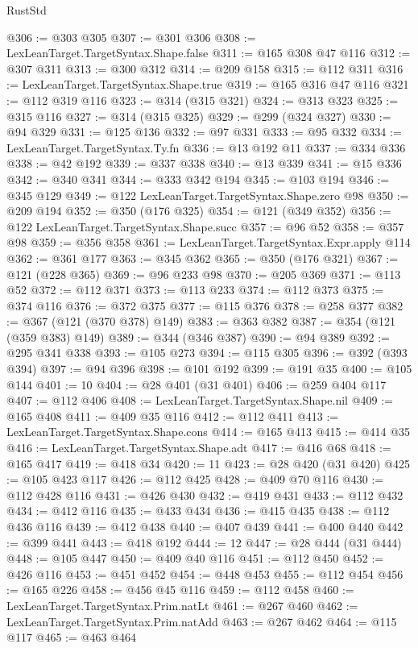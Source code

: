 \begin{lexlean}{RustStd}
\begin{coremodule}
@306 := @303 @305
@307 := @301 @306
@308 := LexLeanTarget.TargetSyntax.Shape.false
@311 := @165 @308 @47 @116
@312 := @307 @311
@313 := @300 @312
@314 := @209 @158
@315 := @112 @311
@316 := LexLeanTarget.TargetSyntax.Shape.true
@319 := @165 @316 @47 @116
@321 := @112 @319 @116
@323 := @314 (@315 @321)
@324 := @313 @323
@325 := @315 @116
@327 := @314 (@315 @325)
@329 := @299 (@324 @327)
@330 := @94 @329
@331 := @125 @136
@332 := @97 @331
@333 := @95 @332
@334 := LexLeanTarget.TargetSyntax.Ty.fn
@336 := @13 @192 @11
@337 := @334 @336
@338 := @42 @192
@339 := @337 @338
@340 := @13 @339
@341 := @15 @336
@342 := @340 @341
@344 := @333 @342 @194
@345 := @103 @194
@346 := @345 @129
@349 := @122 LexLeanTarget.TargetSyntax.Shape.zero @98
@350 := @209 @194
@352 := @350 (@176 @325)
@354 := @121 (@349 @352)
@356 := @122 LexLeanTarget.TargetSyntax.Shape.succ
@357 := @96 @52
@358 := @357 @98
@359 := @356 @358
@361 := LexLeanTarget.TargetSyntax.Expr.apply @114
@362 := @361 @177
@363 := @345 @362
@365 := @350 (@176 @321)
@367 := @121 (@228 @365)
@369 := @96 @233 @98
@370 := @205 @369
@371 := @113 @52
@372 := @112 @371
@373 := @113 @233
@374 := @112 @373
@375 := @374 @116
@376 := @372 @375
@377 := @115 @376
@378 := @258 @377
@382 := @367 (@121 (@370 @378) @149)
@383 := @363 @382
@387 := @354 (@121 (@359 @383) @149)
@389 := @344 (@346 @387)
@390 := @94 @389
@392 := @295 @341 @338
@393 := @105 @273
@394 := @115 @305
@396 := @392 (@393 @394)
@397 := @94 @396
@398 := @101 @192
@399 := @191 @35
@400 := @105 @144
@401 := 10
@404 := @28 @401 (@31 @401)
@406 := @259 @404 @117
@407 := @112 @406
@408 := LexLeanTarget.TargetSyntax.Shape.nil
@409 := @165 @408
@411 := @409 @35 @116
@412 := @112 @411
@413 := LexLeanTarget.TargetSyntax.Shape.cons
@414 := @165 @413
@415 := @414 @35
@416 := LexLeanTarget.TargetSyntax.Shape.adt
@417 := @416 @68
@418 := @165 @417
@419 := @418 @34
@420 := 11
@423 := @28 @420 (@31 @420)
@425 := @105 @423 @117
@426 := @112 @425
@428 := @409 @70 @116
@430 := @112 @428 @116
@431 := @426 @430
@432 := @419 @431
@433 := @112 @432
@434 := @412 @116
@435 := @433 @434
@436 := @415 @435
@438 := @112 @436 @116
@439 := @412 @438
@440 := @407 @439
@441 := @400 @440
@442 := @399 @441
@443 := @418 @192
@444 := 12
@447 := @28 @444 (@31 @444)
@448 := @105 @447
@450 := @409 @40 @116
@451 := @112 @450
@452 := @426 @116
@453 := @451 @452
@454 := @448 @453
@455 := @112 @454
@456 := @165 @226
@458 := @456 @45 @116
@459 := @112 @458
@460 := LexLeanTarget.TargetSyntax.Prim.natLt
@461 := @267 @460
@462 := LexLeanTarget.TargetSyntax.Prim.natAdd
@463 := @267 @462
@464 := @115 @117
@465 := @463 @464

\end{coremodule}
\end{lexlean}

